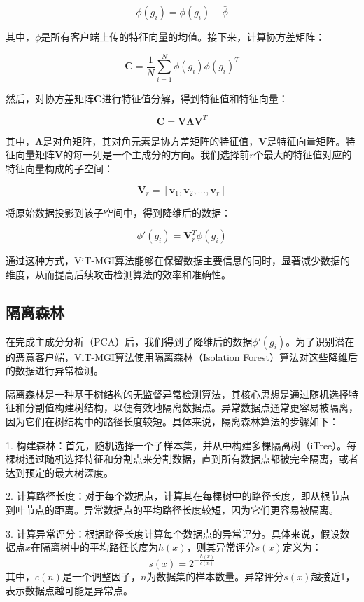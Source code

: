 \documentclass[conference]{IEEEtran}
\begin{document}
\[
\phi(g_i) = \phi(g_i) - \bar{\phi}
\]

其中，$\bar{\phi}$是所有客户端上传的特征向量的均值。接下来，计算协方差矩阵：

\[
\mathbf{C} = \frac{1}{N} \sum_{i=1}^N \phi(g_i) \phi(g_i)^T
\]

然后，对协方差矩阵$\mathbf{C}$进行特征值分解，得到特征值和特征向量：

\[
\mathbf{C} = \mathbf{V} \mathbf{\Lambda} \mathbf{V}^T
\]

其中，$\mathbf{\Lambda}$是对角矩阵，其对角元素是协方差矩阵的特征值，$\mathbf{V}$是特征向量矩阵。特征向量矩阵$\mathbf{V}$的每一列是一个主成分的方向。我们选择前$r$个最大的特征值对应的特征向量构成的子空间：

\[
\mathbf{V}_r = [\mathbf{v}_1, \mathbf{v}_2, \ldots, \mathbf{v}_r]
\]

将原始数据投影到该子空间中，得到降维后的数据：

\[
\phi'(g_i) = \mathbf{V}_r^T \phi(g_i)
\]

通过这种方式，ViT-MGI算法能够在保留数据主要信息的同时，显著减少数据的维度，从而提高后续攻击检测算法的效率和准确性。

\subsection{隔离森林}
\label{sec:method_forest}

在完成主成分分析（PCA）后，我们得到了降维后的数据$\phi'(g_i)$。为了识别潜在的恶意客户端，ViT-MGI算法使用隔离森林（Isolation Forest）算法对这些降维后的数据进行异常检测。

隔离森林是一种基于树结构的无监督异常检测算法，其核心思想是通过随机选择特征和分割值构建树结构，以便有效地隔离数据点。异常数据点通常更容易被隔离，因为它们在树结构中的路径长度较短。具体来说，隔离森林算法的步骤如下：

1. 构建森林：首先，随机选择一个子样本集，并从中构建多棵隔离树（iTree）。每棵树通过随机选择特征和分割点来分割数据，直到所有数据点都被完全隔离，或者达到预定的最大树深度。

2. 计算路径长度：对于每个数据点，计算其在每棵树中的路径长度，即从根节点到叶节点的距离。异常数据点的平均路径长度较短，因为它们更容易被隔离。

3. 计算异常评分：根据路径长度计算每个数据点的异常评分。具体来说，假设数据点$x$在隔离树中的平均路径长度为$h(x)$，则其异常评分$s(x)$定义为：
   \[
   s(x) = 2^{-\frac{h(x)}{c(n)}}
   \]
其中，$c(n)$是一个调整因子，$n$为数据集的样本数量。异常评分$s(x)$越接近1，表示数据点越可能是异常点。
\end{document}

